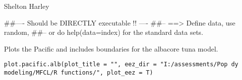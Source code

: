 \documentclass[a4paper]{book}
\begin{document}
%
\begin{Arguments}
\begin{ldescription}
\item[\code{plotdir}] 


\item[\code{plotrep}] 


\item[\code{type}] 


\item[\code{plotname}] 


\item[\code{plottype}] 


\item[\code{COL}] 


\end{ldescription}
\end{Arguments}
%
\begin{Author}\relax

Shelton Harley
\end{Author}
%
\begin{Examples}
\begin{ExampleCode}
##---- Should be DIRECTLY executable !! ----
##-- ==>  Define data, use random,
##--	or do  help(data=index)  for the standard data sets.

\end{ExampleCode}
\end{Examples}
%
\begin{Description}\relax

Plots the Pacific and includes boundaries for the albacore tuna model. 
\end{Description}
%
\begin{Usage}
\begin{verbatim}
plot.pacific.alb(plot_title = "", eez_dir = "I:/assessments/Pop dy modeling/MFCL/R functions/", plot_eez = T)
\end{verbatim}
\end{Usage}
%
\begin{Arguments}
\begin{ldescription}
\item[\code{plot\_title}] 


\item[\code{eez\_dir}] 


\item[\code{plot\_eez}] 


\end{ldescription}
\end{Arguments}
\end{document}
